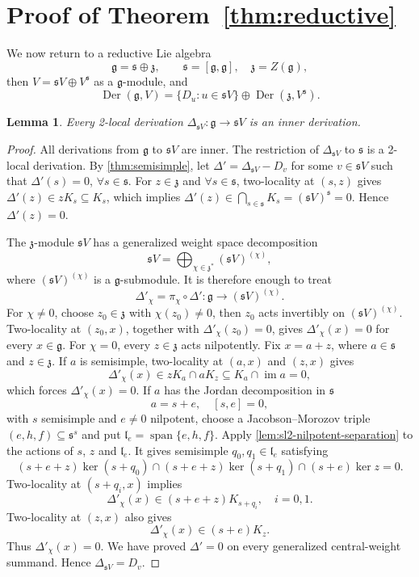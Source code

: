 \documentclass[12pt,reqno]{amsart}
\newtheorem{lemma}[theorem]{Lemma}
\theoremstyle{definition}
\theoremstyle{remark}
\numberwithin{equation}{section}
\newcommand{\g}{\mathfrak{g}}
\newcommand{\s}{\mathfrak{s}}
\newcommand{\z}{\mathfrak{z}}
\newcommand{\Der}{\operatorname{Der}}
\newcommand{\Span}{\operatorname{span}}
\begin{document}
\section{Proof of Theorem~\ref{thm:reductive}}

We now return to a reductive Lie algebra
\[
 \g=\s\oplus\z,\qquad \s=[\g,\g],\quad \z=Z(\g),
\]
then \(V= \s V\oplus V^\s\) as a \(\g\)-module, and
\[
 \Der(\g,V)=\{D_u:u\in \s V\}\oplus \Der(\z,V^\s).
\]

\begin{lemma}\label{lem:core-rigidity}
Every 2-local derivation \(\Delta_{\s V}\colon\g\to \s V\) is an inner derivation.
\end{lemma}

\begin{proof}
All derivations from \(\g\) to \(\s V\) are inner.
The restriction of \(\Delta_{\s V}\) to \(\s\) is a 2-local derivation.  By
\cref{thm:semisimple}, let \(\Delta'= \Delta_{\s V}- D_v\) for some \(v\in \s V\) such that
\(\Delta'(s)= 0\), \(\forall s\in \s\).
For \(z\in\z\) and \(\forall s\in\s\), two-locality at \((s,z)\) gives \(\Delta'(z)\in zK_s\subseteq K_s\),
which implies \(\Delta'(z)\in \bigcap_{s\in\s}K_s=(\s V)^\s=0\). Hence \(\Delta'(z)=0\).

The $\z$-module $\s V$ has a generalized weight space decomposition
\[
 \s V=\bigoplus_{\chi\in\z^*}(\s V)^{(\chi)},
\]
where \((\s V)^{(\chi)}\) is a \(\g\)-submodule.
It is therefore enough to treat
\[
\Delta'_{\chi}=\pi_{\chi}\circ\Delta'\colon\g\to (\s V)^{(\chi)}.
\]
For \(\chi\ne0\), choose \(z_0\in\z\) with
\(\chi(z_0)\ne0\), then \(z_0\) acts invertibly on \((\s V)^{(\chi)}\).
Two-locality at \((z_0,x)\), together with \(\Delta'_{\chi}(z_0)=0\), gives
\(\Delta'_{\chi}(x)=0\) for every \(x\in\g\).
For \(\chi=0\),  every \(z\in\z\) acts nilpotently.
Fix \(x=a+z\), where \(a\in\s\) and \(z\in\z\).  If \(a\) is semisimple, two-locality at \((a,x)\) and
\((z,x)\) gives
\[
 \Delta'_{\chi}(x)\in z K_a\cap aK_z\subseteq K_a\cap \operatorname{im}a= 0,
\]
which forces \(\Delta'_{\chi}(x)=0\).
If \(a\) has the Jordan decomposition in \(\s\)
\[
 a=s+e,\quad [s,e]=0,
\]
with \(s\) semisimple and \(e\ne 0\) nilpotent, choose a Jacobson--Morozov triple \((e,h,f)\subseteq\s^s\)
and put \(\mathfrak l_e=\Span\{e,h,f\}\).  Apply
\cref{lem:sl2-nilpotent-separation} to the actions of \(s\), \(z\) and
\(\mathfrak l_e\).  It gives semisimple \(q_0,q_1\in\mathfrak l_e\) satisfying
\[
(s+e+z)\ker(s+q_0)\cap(s+e+z)\ker(s+q_1)\cap(s+e)\ker z= 0.
\]  
Two-locality at \((s+q_i,x)\) implies
\[
 \Delta'_{\chi}(x)\in(s+e+z)K_{s+q_i},\quad i=0,1.
\]
Two-locality at \((z,x)\) also gives
\[
 \Delta'_{\chi}(x)\in(s+e)K_z.
\]
Thus \(\Delta'_{\chi}(x)=0\).
We have proved \(\Delta'=0\) on every generalized central-weight summand. Hence \(\Delta_{\s V}= D_v\).
\end{proof}
\end{document}
